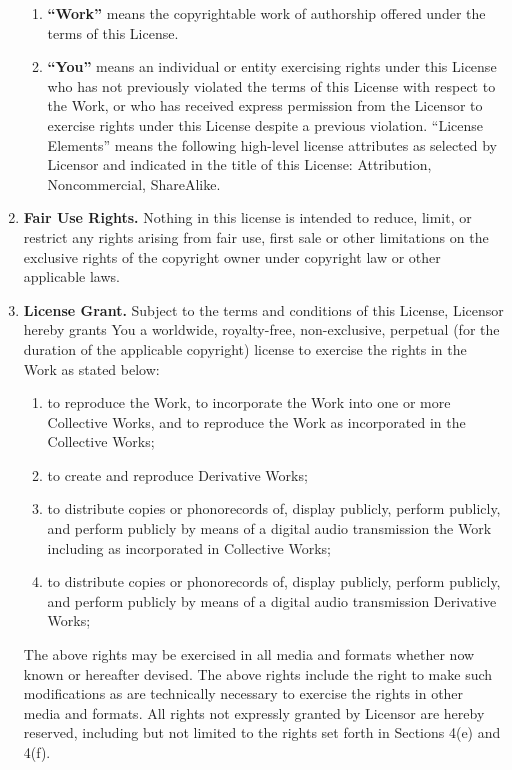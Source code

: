 \begin{enumerate}
\begin{enumerate}
\item \textbf{``Work''} means the copyrightable work of authorship
offered under the terms of this License.

\item \textbf{``You''} means an individual or entity exercising rights
under this License who has not previously violated the terms of this
License with respect to the Work, or who has received express
permission from the Licensor to exercise rights under this License
despite a previous violation.  ``License Elements'' means the following
high-level license attributes as selected by Licensor and indicated in
the title of this License: Attribution, Noncommercial, ShareAlike.
\end{enumerate}

\item \textbf{Fair Use Rights.} Nothing in this license is intended to
reduce, limit, or restrict any rights arising from fair use, first
sale or other limitations on the exclusive rights of the copyright
owner under copyright law or other applicable laws.


\item \textbf{License Grant.} Subject to the terms and conditions of
this License, Licensor hereby grants You a worldwide, royalty-free,
non-exclusive, perpetual (for the duration of the applicable
copyright) license to exercise the rights in the Work as stated below:

\begin{enumerate}
\item to reproduce the Work, to incorporate the Work into one or more
Collective Works, and to reproduce the Work as incorporated in the
Collective Works;
\item to create and reproduce Derivative Works;
\item to distribute copies or phonorecords of, display publicly,
perform publicly, and perform publicly by means of a digital audio
transmission the Work including as incorporated in Collective Works;
\item to distribute copies or phonorecords of, display publicly,
perform publicly, and perform publicly by means of a digital audio
transmission Derivative Works;
\end{enumerate}
The above rights may be exercised in all media and formats whether now
known or hereafter devised. The above rights include the right to make
such modifications as are technically necessary to exercise the rights
in other media and formats. All rights not expressly granted by
Licensor are hereby reserved, including but not limited to the rights
set forth in Sections 4(e) and 4(f).


\end{enumerate}
